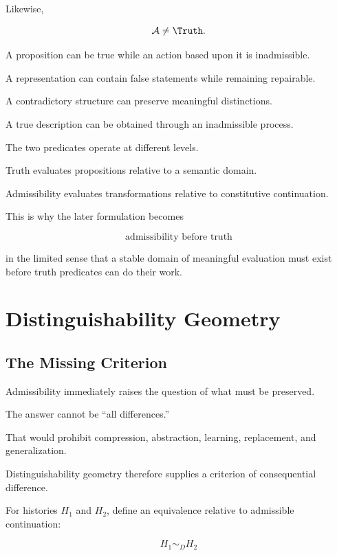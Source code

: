 \documentclass[11pt]{article}
\theoremstyle{remark}
\newcommand{\Adm}{\mathcal{A}}
\begin{document}
Likewise,

\begin{equation}
\Adm
\neq
\Truth.
\end{equation}

A proposition can be true while an action based upon it is inadmissible.

A representation can contain false statements while remaining repairable.

A contradictory structure can preserve meaningful distinctions.

A true description can be obtained through an inadmissible process.

The two predicates operate at different levels.

Truth evaluates propositions relative to a semantic domain.

Admissibility evaluates transformations relative to constitutive continuation.

This is why the later formulation becomes

\begin{equation}
\text{admissibility before truth}
\end{equation}

in the limited sense that a stable domain of meaningful evaluation must exist before truth predicates can do their work.

\section{Distinguishability Geometry}

\subsection{The Missing Criterion}

Admissibility immediately raises the question of what must be preserved.

The answer cannot be ``all differences.''

That would prohibit compression, abstraction, learning, replacement, and generalization.

Distinguishability geometry therefore supplies a criterion of consequential difference.

For histories $H_1$ and $H_2$, define an equivalence relative to admissible continuation:

\begin{equation}
H_1
\sim_D
H_2
\end{equation}
\end{document}

